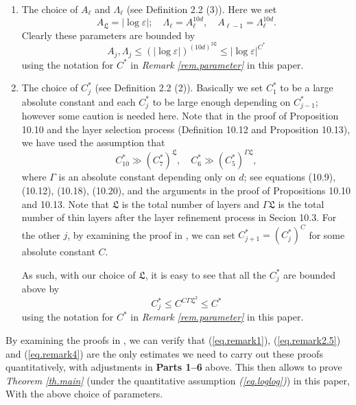\documentclass[10pt, reqno]{amsart}
\newcommand{\Lf}{\mathfrak L}
\theoremstyle{definition}
\theoremstyle{remark}
\numberwithin{equation}{section}
\begin{document}
\begin{enumerate}
\item The choice of $A_\ell$ and $\Lambda_\ell$ (see Definition 2.2 (3)). Here we set
\begin{equation}\label{eq.remark2}A_\Lf=|\log\varepsilon|;\quad \Lambda_\ell=A_\ell^{10d},\quad A_{\ell-1}=\Lambda_\ell^{10d}.\end{equation} Clearly these parameters are bounded by
\begin{equation}\label{eq.remark2.5}A_j,\Lambda_j\leq(|\log\varepsilon|)^{(10d)^{2\Lf}}\leq|\log\varepsilon|^{C^*}\end{equation} using the notation for $C^*$ in \emph{Remark \ref{rem.parameter}} in this paper.
\item The choice of $C_j^*$ (see Definition 2.2 (2)). Basically we set $C_1^*$ to be a large absolute constant and each $C_j^*$ to be large enough depending on $C_{j-1}^*$; however some caution is needed here. Note that in the proof of Proposition 10.10 and the layer selection process (Definition 10.12 and Proposition 10.13), we have used the assumption that
\begin{equation}\label{eq.remark3}C_{10}^*\gg (C_7^*)^{\Lf},\quad C_6^*\gg (C_5^*)^{\Gamma\Lf},
\end{equation} where $\Gamma$ is an absolute constant depending only on $d$; see equations (10.9), (10.12), (10.18), (10.20), and the arguments in the proof of Propositions 10.10 and 10.13. Note that $\Lf$ is the total number of layers and $\Gamma\Lf$ is the total number of thin layers after the layer refinement process in Secion 10.3. For the other $j$, by examining the proof in \cite{DHM24}, we can set $C_{j+1}^*=(C_j^*)^C$ for some absolute constant $C$.

As such, with our choice of $\Lf$, it is easy to see that all the $C_j^*$ are bounded above by
\begin{equation}\label{eq.remark4}C_j^*\leq C^{C\Gamma\Lf^2}\leq C^*\end{equation} using the notation for $C^*$ in \emph{Remark \ref{rem.parameter}} in this paper.
\end{enumerate}

By examining the proofs in  \cite{DHM24}, we can verify that (\ref{eq.remark1}), (\ref{eq.remark2.5}) and (\ref{eq.remark4}) are the only estimates we need to carry out these proofs quantitatively, with adjustments in \textbf{Parts 1--6} above. This then allows to prove \emph{Theorem \ref{th.main}} (under the quantitative assumption \emph{(\ref{eq.loglog})}) in this paper, With the above choice of parameters.
\end{document}
